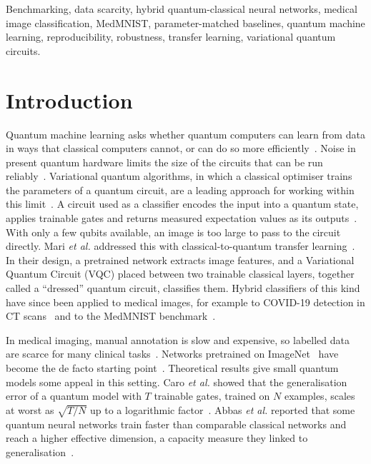 \documentclass{ieeeaccess}
\newcommand{\vqc}{VQC}
\begin{document}
\begin{keywords}
Benchmarking, data scarcity, hybrid quantum-classical neural networks, medical image classification, MedMNIST, parameter-matched baselines, quantum machine learning, reproducibility, robustness, transfer learning, variational quantum circuits.
\end{keywords}

\titlepgskip=-15pt

\maketitle

\section{Introduction}
\label{sec:introduction}
Quantum machine learning asks whether quantum computers can learn from data in ways that classical computers cannot, or can do so more efficiently~\cite{biamonte2017}. Noise in present quantum hardware limits the size of the circuits that can be run reliably~\cite{preskill2018}. Variational quantum algorithms, in which a classical optimiser trains the parameters of a quantum circuit, are a leading approach for working within this limit~\cite{cerezo2021vqa}. A circuit used as a classifier encodes the input into a quantum state, applies trainable gates and returns measured expectation values as its outputs~\cite{mitarai2018,schuld2020circuit}. With only a few qubits available, an image is too large to pass to the circuit directly. Mari \emph{et al.} addressed this with classical-to-quantum transfer learning~\cite{mari2020}. In their design, a pretrained network extracts image features, and a Variational Quantum Circuit (\vqc{}) placed between two trainable classical layers, together called a ``dressed'' quantum circuit, classifies them. Hybrid classifiers of this kind have since been applied to medical images, for example to COVID-19 detection in CT scans~\cite{acar2021} and to the MedMNIST benchmark~\cite{epa2026}.

In medical imaging, manual annotation is slow and expensive, so labelled data are scarce for many clinical tasks~\cite{litjens2017,cheplygina2019}. Networks pretrained on ImageNet~\cite{deng2009} have become the de facto starting point~\cite{raghu2019}. Theoretical results give small quantum models some appeal in this setting. Caro \emph{et al.} showed that the generalisation error of a quantum model with $T$ trainable gates, trained on $N$ examples, scales at worst as $\sqrt{T/N}$ up to a logarithmic factor~\cite{caro2022}. Abbas \emph{et al.} reported that some quantum neural networks train faster than comparable classical networks and reach a higher effective dimension, a capacity measure they linked to generalisation~\cite{abbas2021}.
\end{document}
